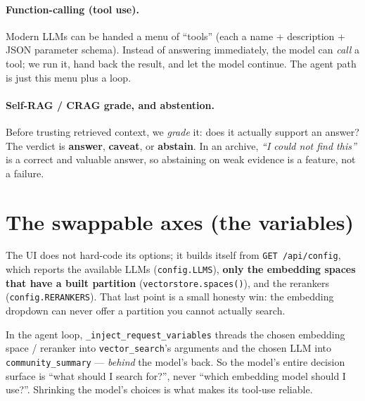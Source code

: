 \documentclass[11pt]{article}
\newcommand{\code}[1]{\texttt{#1}}
\begin{document}
\paragraph{Function-calling (tool use).} Modern LLMs can be handed a menu of
``tools'' (each a name + description + JSON parameter schema). Instead of
answering immediately, the model can \emph{call} a tool; we run it, hand back the
result, and let the model continue. The agent path is just this menu plus a loop.

\paragraph{Self-RAG / CRAG grade, and abstention.} Before trusting retrieved
context, we \emph{grade} it: does it actually support an answer? The verdict is
\textbf{answer}, \textbf{caveat}, or \textbf{abstain}. In an archive,
\emph{``I could not find this''} is a correct and valuable answer, so abstaining
on weak evidence is a feature, not a failure.

\section{The swappable axes (the variables)}

The UI does not hard-code its options; it builds itself from
\code{GET /api/config}, which reports the available LLMs (\code{config.LLMS}),
\textbf{only the embedding spaces that have a built partition}
(\code{vectorstore.spaces()}), and the rerankers (\code{config.RERANKERS}). That
last point is a small honesty win: the embedding dropdown can never offer a
partition you cannot actually search.

\begin{ideabox}
In the agent loop, \code{\_inject\_request\_variables} threads the chosen
embedding space / reranker into \code{vector\_search}'s arguments and the chosen
LLM into \code{community\_summary} --- \emph{behind} the model's back. So the
model's entire decision surface is ``what should I search for?'', never ``which
embedding model should I use?''. Shrinking the model's choices is what makes its
tool-use reliable.
\end{ideabox}

\end{document}
